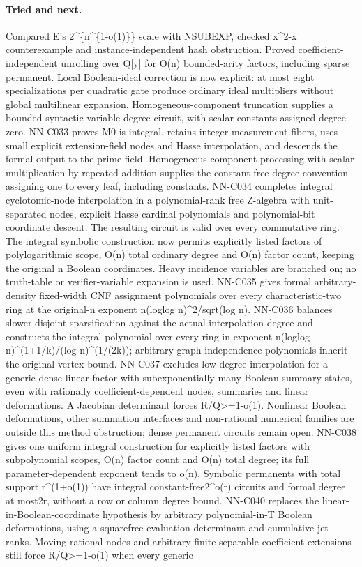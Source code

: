 \paragraph{Tried and next.} Compared E's 2\textasciicircum{}\{n\textasciicircum{}\{1-o(1)\}\} scale with NSUBEXP, checked x\textasciicircum{}2-x counterexample and instance-independent hash obstruction. Proved coefficient-independent unrolling over Q[y] for O(n) bounded-arity factors, including sparse permanent. Local Boolean-ideal correction is now explicit: at most eight specializations per quadratic gate produce ordinary ideal multipliers without global multilinear expansion. Homogeneous-component truncation supplies a bounded syntactic variable-degree circuit, with scalar constants assigned degree zero. NN-C033 proves M0 is integral, retains integer measurement fibers, uses small explicit extension-field nodes and Hasse interpolation, and descends the formal output to the prime field. Homogeneous-component processing with scalar multiplication by repeated addition supplies the constant-free degree convention assigning one to every leaf, including constants. NN-C034 completes integral cyclotomic-node interpolation in a polynomial-rank free Z-algebra with unit-separated nodes, explicit Hasse cardinal polynomials and polynomial-bit coordinate descent. The resulting circuit is valid over every commutative ring. The integral symbolic construction now permits explicitly listed factors of polylogarithmic scope, O(n) total ordinary degree and O(n) factor count, keeping the original n Boolean coordinates. Heavy incidence variables are branched on; no truth-table or verifier-variable expansion is used. NN-C035 gives formal arbitrary-density fixed-width CNF assignment polynomials over every characteristic-two ring at the original-n exponent n(loglog n)\textasciicircum{}2/sqrt(log n). NN-C036 balances slower disjoint sparsification against the actual interpolation degree and constructs the integral polynomial over every ring in exponent n(loglog n)\textasciicircum{}(1+1/k)/(log n)\textasciicircum{}(1/(2k)); arbitrary-graph independence polynomials inherit the original-vertex bound. NN-C037 excludes low-degree interpolation for a generic dense linear factor with subexponentially many Boolean summary states, even with rationally coefficient-dependent nodes, summaries and linear deformations. A Jacobian determinant forces R/Q>=1-o(1). Nonlinear Boolean deformations, other summation interfaces and non-rational numerical families are outside this method obstruction; dense permanent circuits remain open. NN-C038 gives one uniform integral construction for explicitly listed factors with subpolynomial scopes, O(n) factor count and O(n) total degree; its full parameter-dependent exponent tends to o(n). Symbolic permanents with total support r\textasciicircum{}(1+o(1)) have integral constant-free2\textasciicircum{}o(r) circuits and formal degree at most2r, without a row or column degree bound. NN-C040 replaces the linear-in-Boolean-coordinate hypothesis by arbitrary polynomial-in-T Boolean deformations, using a squarefree evaluation determinant and cumulative jet ranks. Moving rational nodes and arbitrary finite separable coefficient extensions still force R/Q>=1-o(1) when every generic 
